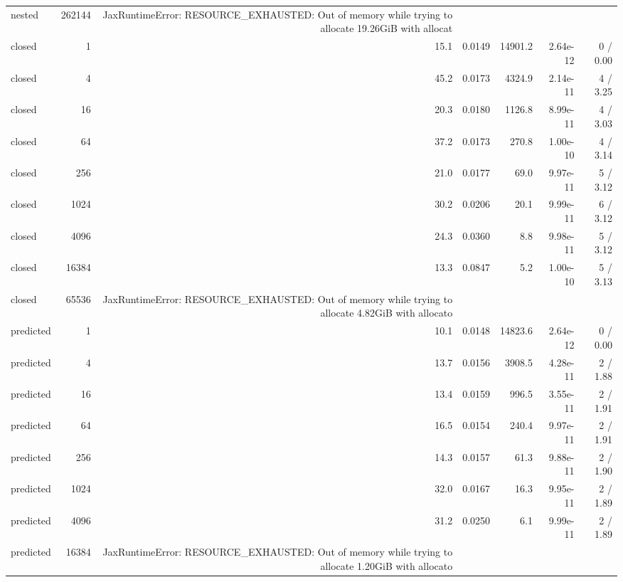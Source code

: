 \begin{tabular}{lrrrrrr}
nested & 262144 & JaxRuntimeError: RESOURCE_EXHAUSTED: Out of memory while trying to allocate 19.26GiB with allocat &  &  &  &  \\
closed & 1 & 15.1 & 0.0149 & 14901.2 & 2.64e-12 & 0 / 0.00 \\
closed & 4 & 45.2 & 0.0173 & 4324.9 & 2.14e-11 & 4 / 3.25 \\
closed & 16 & 20.3 & 0.0180 & 1126.8 & 8.99e-11 & 4 / 3.03 \\
closed & 64 & 37.2 & 0.0173 & 270.8 & 1.00e-10 & 4 / 3.14 \\
closed & 256 & 21.0 & 0.0177 & 69.0 & 9.97e-11 & 5 / 3.12 \\
closed & 1024 & 30.2 & 0.0206 & 20.1 & 9.99e-11 & 6 / 3.12 \\
closed & 4096 & 24.3 & 0.0360 & 8.8 & 9.98e-11 & 5 / 3.12 \\
closed & 16384 & 13.3 & 0.0847 & 5.2 & 1.00e-10 & 5 / 3.13 \\
closed & 65536 & JaxRuntimeError: RESOURCE_EXHAUSTED: Out of memory while trying to allocate 4.82GiB with allocato &  &  &  &  \\
predicted & 1 & 10.1 & 0.0148 & 14823.6 & 2.64e-12 & 0 / 0.00 \\
predicted & 4 & 13.7 & 0.0156 & 3908.5 & 4.28e-11 & 2 / 1.88 \\
predicted & 16 & 13.4 & 0.0159 & 996.5 & 3.55e-11 & 2 / 1.91 \\
predicted & 64 & 16.5 & 0.0154 & 240.4 & 9.97e-11 & 2 / 1.91 \\
predicted & 256 & 14.3 & 0.0157 & 61.3 & 9.88e-11 & 2 / 1.90 \\
predicted & 1024 & 32.0 & 0.0167 & 16.3 & 9.95e-11 & 2 / 1.89 \\
predicted & 4096 & 31.2 & 0.0250 & 6.1 & 9.99e-11 & 2 / 1.89 \\
predicted & 16384 & JaxRuntimeError: RESOURCE_EXHAUSTED: Out of memory while trying to allocate 1.20GiB with allocato &  &  &  &  \\
\bottomrule
\end{tabular}
